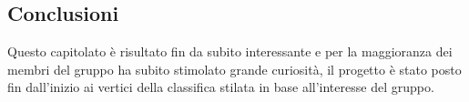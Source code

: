    \subsection{Conclusioni}
    Questo capitolato è risultato fin da subito interessante e per la maggioranza dei membri del gruppo ha subito stimolato grande curiosità, il progetto è stato posto fin dall'inizio ai vertici della classifica stilata in base all'interesse del gruppo.
